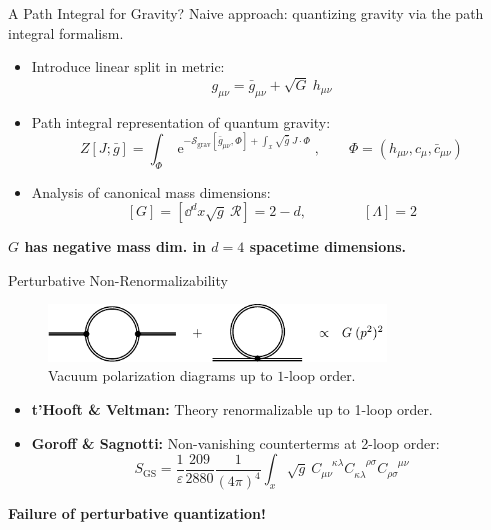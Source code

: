 \documentclass{beamer}
\begin{document}
\begin{frame}{A Path Integral for Gravity?}
Naive approach: quantizing gravity via the path integral formalism.\\
\vspace{0.3cm}
\begin{itemize}
	\item Introduce linear split in metric:
	\begin{equation}
		g_{\mu\nu} = \bar{g}_{\mu\nu} + \sqrt{G} \ h_{\mu\nu}
	\end{equation}
	\item Path integral representation of quantum gravity:
	\begin{equation}
	Z[J ; \bar{g}]=\int_{\Phi} \operatorname{e}^{-\mathcal{S}_{\text{grav}}\left[\bar{g}_{\mu\nu}, \Phi\right]+\int_x \sqrt{\bar{g}} \ J \cdot \Phi}, \qquad \Phi = \left(h_{\mu\nu},c_{\mu},\bar{c}_{\mu\nu}\right)
	\end{equation}
	\item Analysis of canonical mass dimensions:
	 \begin{equation}
\left[G\right] = \left[\dd^dx \sqrt{g}\ \mathcal{R}\right] = 2-d,  \qquad\qquad \left[\Lambda\right] = 2
\end{equation}
\end{itemize}	
\centering\bfseries\large
$G$ has negative mass dim. in $d=4$ spacetime dimensions.
\end{frame}

\begin{frame}{Perturbative Non-Renormalizability}
\begin{figure}[t]
	\centering
	\includegraphics[width=0.8\textwidth]{figures/vacuum_pol}
	\caption{Vacuum polarization diagrams up to $1$-loop order.}
	\hrulefill
\end{figure}
\begin{itemize}
	\item \textbf{t'Hooft \& Veltman:} Theory renormalizable up to 1-loop order. \vspace{0.4cm}
	\item \textbf{Goroff \& Sagnotti:} Non-vanishing counterterms at 2-loop order:
	\begin{equation}
		 S_{\mathrm{GS}}=\frac{1}{\varepsilon} \frac{209}{2880} \frac{1}{(4 \pi)^{4}} \int_x \sqrt{g} \ C_{\mu \nu}^{\phantom{\mu \nu}\kappa \lambda} C_{\kappa \lambda}^{\phantom{\kappa \lambda}\rho \sigma} C_{\rho \sigma}^{\phantom{\rho \sigma}\mu \nu}
		\end{equation}
\end{itemize}
\vspace{0.1cm}
\centering\bfseries\large
Failure of perturbative quantization!	
\end{frame}
\end{document}
